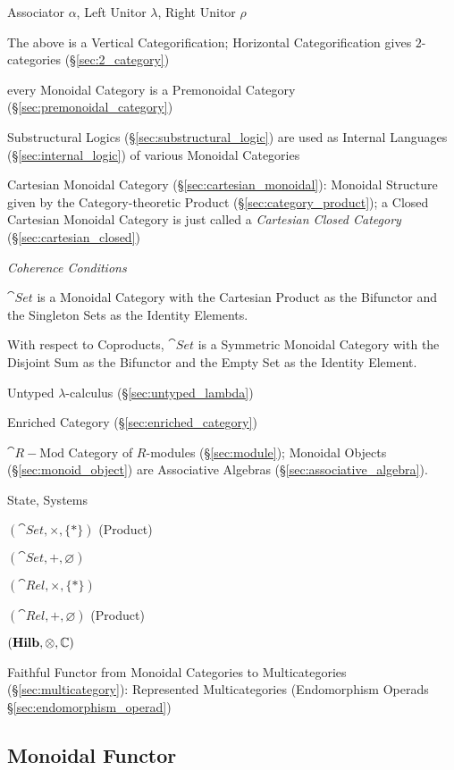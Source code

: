 Associator $\alpha$, Left Unitor $\lambda$, Right Unitor $\rho$

The above is a Vertical Categorification; Horizontal Categorification
gives $2$-categories (\S\ref{sec:2_category})

every Monoidal Category is a Premonoidal Category
(\S\ref{sec:premonoidal_category})

\fist Substructural Logics (\S\ref{sec:substructural_logic}) are used
as Internal Languages (\S\ref{sec:internal_logic}) of various Monoidal
Categories

\fist Cartesian Monoidal Category (\S\ref{sec:cartesian_monoidal}): Monoidal
Structure given by the Category-theoretic Product
(\S\ref{sec:category_product}); a Closed Cartesian Monoidal Category is just
called a \emph{Cartesian Closed Category} (\S\ref{sec:cartesian_closed})

\emph{Coherence Conditions}

$\cat{Set}$ is a Monoidal Category with the Cartesian Product as
the Bifunctor and the Singleton Sets as the Identity Elements.

With respect to Coproducts, $\cat{Set}$ is a Symmetric Monoidal
Category with the Disjoint Sum as the Bifunctor and the Empty
Set as the Identity Element.

Untyped $\lambda$-calculus (\S\ref{sec:untyped_lambda})

Enriched Category (\S\ref{sec:enriched_category})

$\cat{R-\text{Mod}}$ Category of $R$-modules (\S\ref{sec:module});
Monoidal Objects (\S\ref{sec:monoid_object}) are Associative Algebras
(\S\ref{sec:associative_algebra}).

State, Systems %

$(\cat{Set}, \times, \{*\})$ (Product)

$(\cat{Set}, +, \varnothing)$

$(\cat{Rel}, \times, \{*\})$

$(\cat{Rel}, +, \varnothing)$ (Product)

$(\mathbf{Hilb}, \otimes, \mathbb{C})$

Faithful Functor from Monoidal Categories to Multicategories
(\S\ref{sec:multicategory}): Represented Multicategories (Endomorphism
Operads \S\ref{sec:endomorphism_operad})



\subsection{Monoidal Functor}\label{sec:monoidal_functor}

